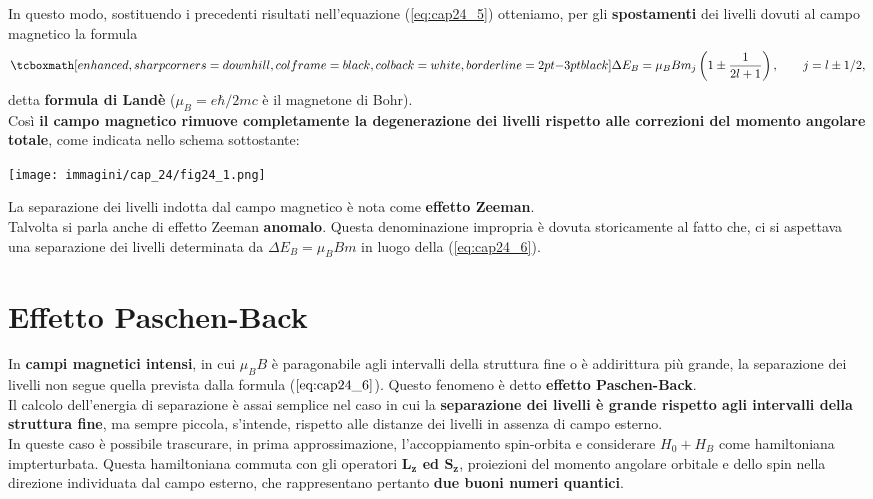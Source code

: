 In questo modo, sostituendo i precedenti risultati nell'equazione (\ref{eq:cap24_5}) otteniamo, per gli \textbf{spostamenti} dei livelli dovuti al campo magnetico la formula
	\begin{equation}
	\label{eq:cap24_6}
		\tcboxmath[enhanced, sharp corners=downhill, colframe=black, colback=white, borderline={2pt}{-3pt}{black}]{
			\Delta E_B= \mu_B B m_j \left( 1\pm \frac{1}{2l+1}\right), \qquad j=l\pm 1/2 ,
			}
	\end{equation}
detta \textbf{formula di Landè} ($\mu_B=e\hbar /2mc$ è il magnetone di Bohr).\\

Così \textbf{il campo magnetico rimuove completamente la degenerazione dei livelli rispetto alle correzioni del momento angolare totale}, come indicata nello schema sottostante: 
\begin{center}
\begin{tcolorbox}[sharp corners=downhill, width=.9\textwidth, colframe=black, colback=white]
\texttt{[image: immagini/cap\_24/fig24\_1.png]}
\end{tcolorbox}
\end{center}

La separazione dei livelli indotta dal campo magnetico è nota come \textbf{effetto Zeeman}. \\

Talvolta si parla anche di effetto Zeeman \textbf{anomalo}. Questa denominazione impropria è dovuta storicamente al fatto che, ci si aspettava una separazione dei livelli determinata da $\Delta E_B=\mu_BBm$ in luogo della (\ref{eq:cap24_6}).

\section{Effetto Paschen-Back}
In \textbf{campi magnetici intensi}, in cui $\mu_B B$ è paragonabile agli intervalli della struttura fine o è addirittura più grande, la separazione dei livelli non segue quella prevista dalla formula ($\ref{eq:cap24_6}$). Questo fenomeno è detto \textbf{effetto Paschen-Back}. \\

Il calcolo dell'energia di separazione è assai semplice nel caso in cui la \textbf{separazione dei livelli è grande rispetto agli intervalli della struttura fine}, ma sempre piccola, s'intende, rispetto alle distanze dei livelli in assenza di campo esterno. \\

In queste caso è possibile trascurare, in prima approssimazione, l'accoppiamento spin-orbita e considerare $ H_0+H_B $ come hamiltoniana impterturbata. Questa hamiltoniana commuta con gli operatori \textbf{$\boldsymbol{L_z}$ ed $\boldsymbol{S_z}$}, proiezioni del momento angolare orbitale e dello spin nella direzione individuata dal campo esterno, che rappresentano pertanto \textbf{due buoni numeri quantici}. \\


